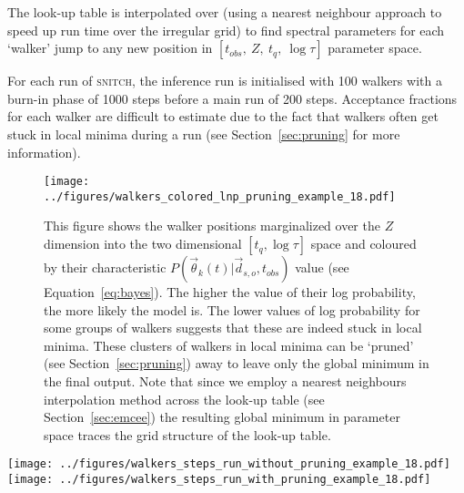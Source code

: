 \documentclass[useAMS,usenatbib]{mn2e}
\begin{document}
 
The look-up table is interpolated over (using a nearest neighbour approach to speed up run time over the irregular grid) to find spectral parameters for each `walker' jump to any new position in $[t_{obs},~Z,~t_q,~\log\tau]$ parameter space. 

For each run of \textsc{snitch}, the inference run is initialised with 100 walkers with a burn-in phase of 1000 steps before a main run of 200 steps. Acceptance fractions for each walker are difficult to estimate due to the fact that walkers often get stuck in local minima during a run (see Section~\ref{sec:pruning} for more information). 

\begin{figure}
\centering
\texttt{[image: ../figures/walkers\_colored\_lnp\_pruning\_example\_18.pdf]}
\caption{This figure shows the walker positions marginalized over the $Z$ dimension into the two dimensional $[t_q, \log\tau]$ space and coloured by their characteristic $P(\vec{\theta}_k (t)|\vec{d}_{s,o}, t_{obs})$ value (see Equation~\ref{eq:bayes}). The higher the value of their log probability, the more likely the model is. The lower values of log probability for some groups of walkers suggests that these are indeed stuck in local minima. These clusters of walkers in local minima can be `pruned' (see Section~\ref{sec:pruning}) away to leave only the global minimum in the final output. Note that since we employ a nearest neighbours interpolation method across the look-up table (see Section~\ref{sec:emcee}) the resulting global minimum in parameter space traces the grid structure of the look-up table.}
\label{fig:localminima}
\end{figure}


\begin{figure*}
\centering
\texttt{[image: ../figures/walkers\_steps\_run\_without\_pruning\_example\_18.pdf]}
\texttt{[image: ../figures/walkers\_steps\_run\_with\_pruning\_example\_18.pdf]}
\caption{The positions traced by the \emph{emcee} walkers with step number (i.e. time) in each of the $[Z, t_q, \log \tau]$ dimensions in the post burn-in phase before pruning (left) and after pruning (right). Walkers have got stuck in local minima (see also Figure~\ref{fig:localminima}) but some have managed to find the global minimum. The right panel therefore shows how the walkers left after pruning have fully explored the global minimum around the known true values (shown in red in each panel).}
\label{fig:comparepruning}
\end{figure*}
\end{document}
